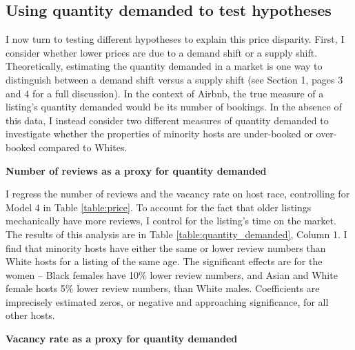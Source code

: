 

\subsection{Using quantity demanded to test hypotheses}

I now turn to testing different hypotheses to explain this price disparity. First, I consider whether lower prices are due to a demand shift or a supply shift. Theoretically, estimating the quantity demanded in a market is one way to distinguish between a demand shift versus a supply shift (see Section 1, pages 3 and 4 for a full discussion). In the context of Airbnb, the true measure of a listing's quantity demanded would be its number of bookings. In the absence of this data, I instead consider two different measures of quantity demanded to investigate whether the properties of minority hosts are under-booked or over-booked compared to Whites. 

\textbf{Number of reviews as a proxy for quantity demanded} 

I regress the number of reviews and the vacancy rate on host race, controlling for Model 4 in Table \ref{table:price}. To account for the fact that older listings mechanically have more reviews, I control for the listing's time on the market. The results of this analysis are in Table \ref{table:quantity_demanded}, Column 1. I find that minority hosts have either the same or lower review numbers than White hosts for a listing of the same age. The significant effects are for the women -- Black females have 10\% lower review numbers, and Asian and White female hosts 5\% lower review numbers, than White males. Coefficients are imprecisely estimated zeros, or negative and approaching significance, for all other hosts. 

\textbf{Vacancy rate as a proxy for quantity demanded} 

